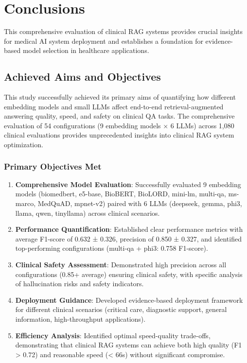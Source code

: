 \chapter{Conclusions}

This comprehensive evaluation of clinical RAG systems provides crucial insights for medical AI system deployment and establishes a foundation for evidence-based model selection in healthcare applications.

\section{Achieved Aims and Objectives}

This study successfully achieved its primary aims of quantifying how different embedding models and small LLMs affect end-to-end retrieval-augmented answering quality, speed, and safety on clinical QA tasks. The comprehensive evaluation of 54 configurations (9 embedding models × 6 LLMs) across 1,080 clinical evaluations provides unprecedented insights into clinical RAG system optimization.

\subsection{Primary Objectives Met}

\begin{enumerate}
    \item \textbf{Comprehensive Model Evaluation}: Successfully evaluated 9 embedding models (biomedbert, e5-base, BioBERT, BioLORD, mini-lm, multi-qa, ms-marco, MedQuAD, mpnet-v2) paired with 6 LLMs (deepseek, gemma, phi3, llama, qwen, tinyllama) across clinical scenarios.

    \item \textbf{Performance Quantification}: Established clear performance metrics with average F1-score of 0.632 ± 0.326, precision of 0.850 ± 0.327, and identified top-performing configurations (multi-qa + phi3: 0.758 F1-score).

    \item \textbf{Clinical Safety Assessment}: Demonstrated high precision across all configurations (0.85+ average) ensuring clinical safety, with specific analysis of hallucination risks and safety indicators.

    \item \textbf{Deployment Guidance}: Developed evidence-based deployment framework for different clinical scenarios (critical care, diagnostic support, general information, high-throughput applications).

    \item \textbf{Efficiency Analysis}: Identified optimal speed-quality trade-offs, demonstrating that clinical RAG systems can achieve both high quality (F1 > 0.72) and reasonable speed (< 66s) without significant compromise.
\end{enumerate}

